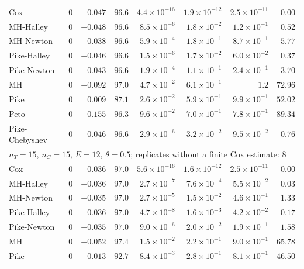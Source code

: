 \begin{landscape}
\begin{longtable}{lrrrrrrr}
Cox & 0 & $-0.047$ & $96.6$ & $4.4 \times 10^{-16}$ & $1.9 \times 10^{-12}$ & $2.5 \times 10^{-11}$ & $0.00$ \\
MH-Halley & 0 & $-0.048$ & $96.6$ & $8.5 \times 10^{-6}$ & $1.8 \times 10^{-2}$ & $1.2 \times 10^{-1}$ & $0.52$ \\
MH-Newton & 0 & $-0.038$ & $96.6$ & $5.9 \times 10^{-4}$ & $1.8 \times 10^{-1}$ & $8.7 \times 10^{-1}$ & $5.77$ \\
Pike-Halley & 0 & $-0.046$ & $96.6$ & $1.5 \times 10^{-6}$ & $1.7 \times 10^{-2}$ & $6.0 \times 10^{-2}$ & $0.37$ \\
Pike-Newton & 0 & $-0.043$ & $96.6$ & $1.9 \times 10^{-4}$ & $1.1 \times 10^{-1}$ & $2.4 \times 10^{-1}$ & $3.70$ \\
MH & 0 & $-0.092$ & $97.0$ & $4.7 \times 10^{-2}$ & $6.1 \times 10^{-1}$ & $1.2$ & $72.96$ \\
Pike & 0 & $0.009$ & $87.1$ & $2.6 \times 10^{-2}$ & $5.9 \times 10^{-1}$ & $9.9 \times 10^{-1}$ & $52.02$ \\
Peto & 0 & $0.155$ & $96.3$ & $9.6 \times 10^{-2}$ & $7.0 \times 10^{-1}$ & $7.8 \times 10^{-1}$ & $89.34$ \\
Pike-Chebyshev & 0 & $-0.046$ & $96.6$ & $2.9 \times 10^{-6}$ & $3.2 \times 10^{-2}$ & $9.5 \times 10^{-2}$ & $0.76$ \\
\multicolumn{8}{l}{$n_T = 15$, $n_C = 15$, $E = 12$, $\theta = 0.5$; replicates without a finite Cox estimate: 8} \\
Cox & 0 & $-0.036$ & $97.0$ & $5.6 \times 10^{-16}$ & $1.6 \times 10^{-12}$ & $2.5 \times 10^{-11}$ & $0.00$ \\
MH-Halley & 0 & $-0.036$ & $97.0$ & $2.7 \times 10^{-7}$ & $7.6 \times 10^{-4}$ & $5.5 \times 10^{-2}$ & $0.03$ \\
MH-Newton & 0 & $-0.035$ & $97.0$ & $2.7 \times 10^{-5}$ & $1.5 \times 10^{-2}$ & $4.6 \times 10^{-1}$ & $1.33$ \\
Pike-Halley & 0 & $-0.036$ & $97.0$ & $4.7 \times 10^{-8}$ & $1.6 \times 10^{-3}$ & $4.2 \times 10^{-2}$ & $0.17$ \\
Pike-Newton & 0 & $-0.035$ & $97.0$ & $9.0 \times 10^{-6}$ & $2.0 \times 10^{-2}$ & $1.9 \times 10^{-1}$ & $1.58$ \\
MH & 0 & $-0.052$ & $97.4$ & $1.5 \times 10^{-2}$ & $2.2 \times 10^{-1}$ & $9.0 \times 10^{-1}$ & $65.78$ \\
Pike & 0 & $-0.013$ & $92.7$ & $8.4 \times 10^{-3}$ & $2.8 \times 10^{-1}$ & $8.1 \times 10^{-1}$ & $46.50$ \\

\end{longtable}
\end{landscape}
